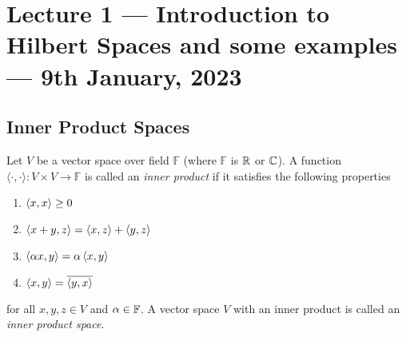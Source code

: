 \section{Lecture 1  --- Introduction to Hilbert Spaces and some examples --- 9th January, 2023}

\subsection{Inner Product Spaces}
\begin{definition}
    Let $V$ be a vector space over field $\mathbb F$ (where $\mathbb F$ is $\mathbb R$ or $\mathbb C$). A function $\langle \cdot , \cdot \rangle : V \times V \to \mathbb F$ is called an \textit{inner product} if it satisfies the following properties
    \begin{enumerate}
	\item $\left\langle x, x \right\rangle \ge 0$
	\item $\left\langle x+y, z \right\rangle = \left\langle x, z \right\rangle + \left\langle y, z \right\rangle$
	\item $\left\langle \alpha x, y \right\rangle = \alpha \left\langle x, y \right\rangle$
	\item $\left\langle x, y \right\rangle = \overline{\left\langle y, x \right\rangle}$
    \end{enumerate}
    for all $x,y,z \in V$ and $\alpha \in \mathbb F$. A vector space $V$ with an inner product is called an \textit{inner product space}.
    \label{def:inner-product}
\end{definition}

